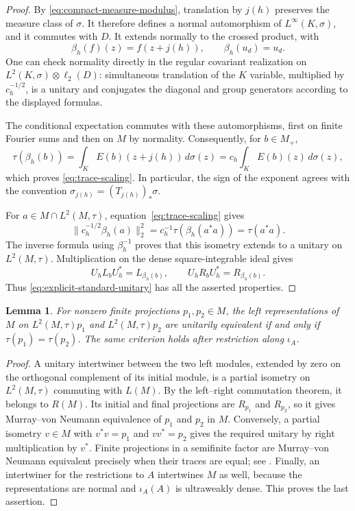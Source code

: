 \documentclass[11pt]{article}
\newtheorem{lemma}[theorem]{Lemma}
\theoremstyle{definition}
\begin{document}
\begin{proof}
By \eqref{eq:compact-measure-modulus}, translation by $j(h)$ preserves
the measure class of $\sigma$. It therefore defines a normal
automorphism of $L^\infty(K,\sigma)$, and it commutes with $D$.
It extends normally to the crossed product, with
\[
 \beta_h(f)(z)=f(z+j(h)),\qquad \beta_h(u_d)=u_d.
\]
One can check normality directly in the regular covariant realization
on $L^2(K,\sigma)\otimes\ell_2(D)$: simultaneous translation of the
$K$ variable, multiplied by $c_h^{-1/2}$, is a unitary and conjugates
the diagonal and group generators according to the displayed formulas.

The conditional expectation commutes with these automorphisms, first
on finite Fourier sums and then on $M$ by normality. Consequently,
for $b\in M_+$,
\[
 \tau(\beta_h(b))
   =\int_K E(b)(z+j(h))\,d\sigma(z)
   =c_h\int_K E(b)(z)\,d\sigma(z),
\]
which proves \eqref{eq:trace-scaling}. In particular, the sign of the
exponent agrees with the convention $\sigma_{j(h)}=(T_{j(h)})_*\sigma$.

For $a\in M\cap L^2(M,\tau)$, equation~\eqref{eq:trace-scaling} gives
\[
 \|c_h^{-1/2}\beta_h(a)\|_2^2
   =c_h^{-1}\tau(\beta_h(a^*a))=\tau(a^*a).
\]
The inverse formula using $\beta_h^{-1}$ proves that this isometry
extends to a unitary on $L^2(M,\tau)$. Multiplication on the dense
square-integrable ideal gives
\[
 U_hL_bU_h^*=L_{\beta_h(b)},\qquad
 U_hR_bU_h^*=R_{\beta_h(b)}.
\]
Thus \eqref{eq:explicit-standard-unitary} has all the asserted properties.
\end{proof}

\begin{lemma}
\label{lem:right-corner-comparison}
For nonzero finite projections $p_1,p_2\in M$, the left representations
of $M$ on $L^2(M,\tau)p_1$ and $L^2(M,\tau)p_2$ are unitarily equivalent
if and only if $\tau(p_1)=\tau(p_2)$. The same criterion holds after
restriction along $\iota_A$.
\end{lemma}

\begin{proof}
A unitary intertwiner between the two left modules, extended by zero
on the orthogonal complement of its initial module, is a partial
isometry on $L^2(M,\tau)$ commuting with $L(M)$. By the left--right
commutation theorem, it belongs to $R(M)$. Its initial and final
projections are $R_{p_1}$ and $R_{p_2}$, so it gives Murray--von Neumann
equivalence of $p_1$ and $p_2$ in $M$. Conversely, a partial isometry
$v\in M$ with $v^*v=p_1$ and $vv^*=p_2$ gives the required unitary by
right multiplication by $v^*$. Finite projections in a semifinite
factor are Murray--von Neumann equivalent precisely when their traces
are equal; see \cite[Theorem~2.7 and the factor examples in Section~2]{Sherman}.
Finally, an intertwiner for the restrictions to $A$ intertwines $M$ as
well, because the representations are normal and $\iota_A(A)$ is
ultraweakly dense. This proves the last assertion.
\end{proof}
\end{document}
